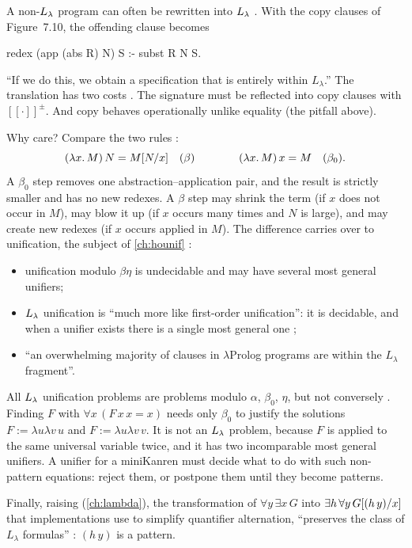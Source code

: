 {{{{{{A non-$L_\lambda$ program can often be rewritten into $L_\lambda$ . With the copy clauses of Figure~7.10, the
offending clause becomes
\begin{lprolog}
redex (app (abs R) N) S :- subst R N S.
\end{lprolog}
\enquote{If we do this, we obtain a specification that is entirely within $L_\lambda$.} The translation has two
costs . The signature must be reflected into copy clauses with $[\![\cdot]\!]^{\pm}$. And copy behaves
operationally unlike equality (the  pitfall above).

Why care? Compare the two rules :
\[
(\lambda x.\,M)\,N=M[N/x]\quad(\beta)\qquad\qquad(\lambda x.\,M)\,x=M\quad(\beta_0).
\]
A $\beta_0$ step removes one abstraction--application pair, and the result is strictly smaller and has no new
redexes. A $\beta$ step may shrink the term (if $x$ does not occur in $M$), may blow it up (if $x$ occurs many times
and $N$ is large), and may create new redexes (if $x$ occurs applied in $M$). The difference carries over to
unification, the subject of \cref{ch:hounif} :
\begin{itemize}[nosep]
  \item unification modulo $\beta\eta$ is undecidable and may have several most general unifiers;
  \item $L_\lambda$ unification is \enquote{much more like first-order unification}: it is decidable, and when a unifier
        exists there is a single most general one \cite{Miller1991,Nipkow1993};
  \item \enquote{an overwhelming majority of clauses in  $\lambda$Prolog programs are within the
        $L_\lambda$ fragment}.
\end{itemize}

\begin{pitfall}
All $L_\lambda$ unification problems are problems modulo $\alpha$, $\beta_0$, $\eta$, but not conversely .
Finding $F$ with $\forall x\,(F\,x\,x=x)$ needs only $\beta_0$ to justify the solutions $F:=\lambda u\lambda v\,u$
and $F:=\lambda u\lambda v\,v$. It is not an $L_\lambda$ problem, because $F$ is applied to the same universal variable
twice, and it has two incomparable most general unifiers. A unifier for a miniKanren must decide what to do with
such non-pattern equations: reject them, or postpone them until they become patterns.
\end{pitfall}

Finally, raising (\cref{ch:lambda}), the transformation of $\forall y\,\allowbreak\exists x\,G$ into
$\exists h\,\allowbreak\forall y\,G[(h\,y)/x]$ that implementations use to simplify quantifier alternation,
\enquote{preserves the class of $L_\lambda$ formulas} : $(h\,y)$ is a pattern.

}}}}}}
